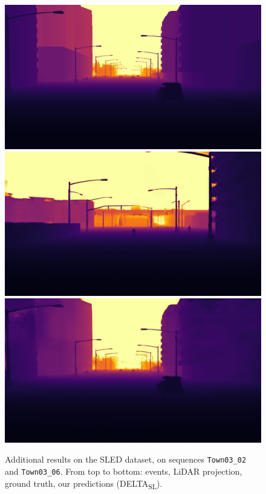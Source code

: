 \begin{figure}
  \includegraphics[width=0.475\linewidth]{mainmatter/figures/c_depth_transf/sled_dense_cmp_additional/data_and_gt/gtbf005176.png}\\
  \includegraphics[width=0.475\linewidth]{mainmatter/figures/c_depth_transf/sled_dense_cmp_additional/delta/predbf004386.png}
  \includegraphics[width=0.475\linewidth]{mainmatter/figures/c_depth_transf/sled_dense_cmp_additional/delta/predbf005176.png}
  \cprotect\caption{Additional results on the SLED dataset, on sequences \verb|Town03_02| and \verb|Town03_06|. From top to bottom: events, LiDAR projection, ground truth, our predictions (DELTA\textsubscript{SL}).}\label{fig:appendix:delta:cmp_sled_additional_good_1}
\end{figure}

